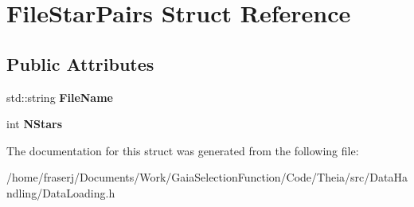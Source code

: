 \hypertarget{structFileStarPairs}{}\section{File\+Star\+Pairs Struct Reference}
\label{structFileStarPairs}
\subsection*{Public Attributes}
\begin{DoxyCompactItemize}
\item 
\mbox{\label{structFileStarPairs_aec9230582e62f0acf8838794aea7e490}} 
std\+::string {\bfseries File\+Name}
\item 
\mbox{\label{structFileStarPairs_a2c8e51cf299f1dbbf2e9d73614aee650}} 
int {\bfseries N\+Stars}
\end{DoxyCompactItemize}


The documentation for this struct was generated from the following file\+:\begin{DoxyCompactItemize}
\item 
/home/fraserj/\+Documents/\+Work/\+Gaia\+Selection\+Function/\+Code/\+Theia/src/\+Data\+Handling/Data\+Loading.\+h\end{DoxyCompactItemize}
